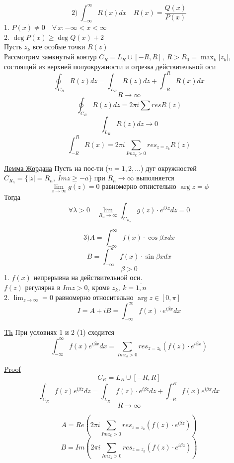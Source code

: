 \documentclass[a4paper]{article}
\begin{document}
\[
    2) \ \int_{-\infty}^{\infty} R(x) dx \quad R(x) = \frac{Q(x)}{P(x)} 
\]
1. $ P(x) \neq 0 \quad \forall \, x: -\infty < x < \infty $ \\
2. $ \deg P(x) \geq \deg Q(x) + 2 $ \\

Пусть $ z_k $ все особые точки $ R(z) $\\

Рассмотрим замкнутый контур $ C_R = L_R \cup [-R, R], \ R > R_0 = \max_k |z_k| $,
состоящий из верхней полуокружности и отрезка действительной оси
\[
    \oint_{C_R} R(z) dz = \int_{L_R} R(z) dz + \int_{-R}^{R} R(x) dx
\]
\[
    R \longrightarrow \infty
\]
\[
    \oint_{C_R} R(z) dz = 2 \pi i \sum res R(z)
\]
\[
    \int_{L_R} R(z) dz \longrightarrow 0
\]
\[
    \int_{-R}^{R} R(x) = 2 \pi i \sum_{Im z_k > 0} res_{z=z_k} R(z)
\]

\begin{tcolorbox}
\underline{Лемма Жордана} Пусть на пос-ти ($ n = 1, 2, \dots $) дуг окружностей
$ C_{R_n} = \{ |z| = R_n, \ Im z \geq - a\} $ при $ R_n \to \infty $ выполняется  
\[
    \lim_{z \to \infty} g(z) = 0 \text{ равномерно отнистельно } \arg z = \phi
\]
Тогда
\[
    \forall \lambda > 0 \quad \lim_{R_n \to \infty} \int_{C_{R_n}} g(z) \cdot 
    e^{i\lambda z} dz = 0
\]
\end{tcolorbox}

\[
    3) A = \int_{-\infty}^{\infty} f(x) \cdot \cos \beta x dx
\]
\[
    B = \int_{-\infty}^{\infty} f(x) \cdot \sin \beta x dx
\]
\[
    \beta > 0
\]
1. $ f(x) $ непрерывна на действительной оси.\\
$ f(z) $ регулярна в $ Im z > 0 $, кроме $z_k, \ k = \overline{1,n} $\\
2. $ \lim_{z \to \infty} = 0 $ равномерно относительно $ \arg z \in [0, \pi] $ 
\begin{equation}
    I = A + iB = \int_{-\infty}^{\infty} f(x) \cdot e^{i \beta x} dx
\end{equation}

\begin{tcolorbox}
\underline{Th} При условиях 1 и 2 (1) сходится
\[
    \int_{-\infty}^{\infty} f(x) e^{i \beta x} dx = 
    \sum_{Im z_k > 0} res_{z = z_k} ( f(z) \cdot e^{i \beta x})
\]

\underline{Proof}
\[
    C_R = L_R \cup [-R, R]
\]
\[
    \int_{C_R} f(z) e^{i \beta z} dz = \int_{L_R} f(z) \cdot e^{i \beta z}dz + 
    \int_{-R}^{R} f(x) e^{i \beta x} dx
\]
\[
    R \to \infty
\]
\end{tcolorbox}
\[
    A = Re\left(2\pi i \sum_{Im z_k > 0} res_{z=z_k} (f(z) \cdot e^{i \beta z})\right)
\]
\[
    B = Im\left(2\pi i \sum_{Im z_k > 0} res_{z=z_k} (f(z) \cdot e^{i \beta z})\right)
\]
\end{document}
